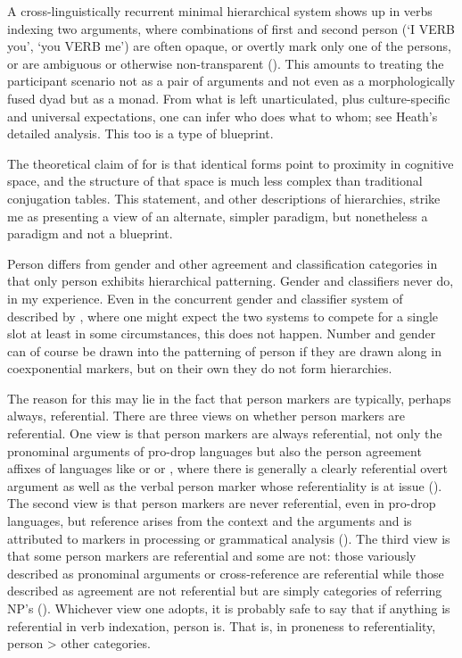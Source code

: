 \documentclass[output=collectionpaper]{langsci/langscibook}
\begin{document}
A cross-linguistically recurrent minimal hierarchical system shows up in verbs indexing two arguments, where combinations of first and second person (`I VERB you', `you VERB me') are often opaque, or overtly mark only one of the persons, or are ambiguous or otherwise non-transparent (\citealt{Heath1991,Heath1998}). This amounts to treating the participant scenario not as a pair of arguments and not even as a morphologically fused dyad but as a monad. From what is left unarticulated, plus culture-specific and universal expectations, one can infer who does what to whom; see Heath's detailed analysis. This too is a type of blueprint.

The theoretical claim of \citet[376]{Kibrik2003} for  is that identical forms point to proximity in cognitive space, and the structure of that space is much less complex than traditional conjugation tables. This statement, and other descriptions of hierarchies, strike me as presenting a view of an alternate, simpler paradigm, but nonetheless a paradigm and not a blueprint.

Person differs from gender and other agreement and classification categories in that only person exhibits hierarchical patterning. Gender and classifiers never do, in my experience. Even in the concurrent gender and classifier system of  described by \citet{Corbett2016}, where one might expect the two systems to compete for a single slot at least in some circumstances, this does not happen. Number and gender can of course be drawn into the patterning of person if they are drawn along in coexponential markers, but on their own they do not form hierarchies.

The reason for this may lie in the fact that person markers are typically, perhaps always, referential. There are three views on whether person markers are referential. One view is that person markers are always referential, not only the pronominal arguments of pro-drop languages but also the person agreement affixes of languages like  or  or , where there is generally a clearly referential overt argument as well as the verbal person marker whose referentiality is at issue (\citealt{Kibrik2011}). The second view is that person markers are never referential, even in pro-drop languages, but reference arises from the context and the arguments and is attributed to markers in processing or grammatical analysis (\citealt{Evans1999,Evans2003}). The third view is that some person markers are referential and some are not: those variously described as pronominal arguments or cross-reference are referential while those described as agreement are not referential but are simply categories of referring NP's (\citealt{Hengeveld2012}). Whichever view one adopts, it is probably safe to say that if anything is referential in verb indexation, person is. That is, in proneness to referentiality, person > other categories.
\end{document}

